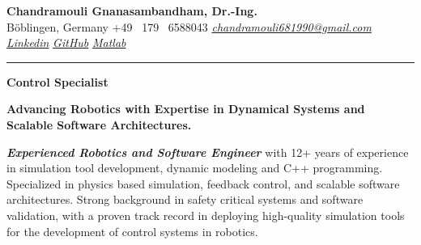 \documentclass[a4paper,10pt]{article}
\newcommand{\link}[1]{{\textit{#1}}}
\begin{document}
\thispagestyle{plain}

\begin{center}
    {\Large \textbf{Chandramouli Gnanasambandham, Dr.-Ing.}}\\ 
    
    \vspace{0.2cm}
    \small B\"oblingen, Germany \hfill  \bullet  \hfill  +49 \ 179 \ 6588043 \hfill \bullet  \hfill
    \textup{\href{mailto:chandramouli681990@gmail.com}{\link{chandramouli681990@gmail.com}}} \hfill \bullet \hfill
    \textup{\href{https://linkedin.com/in/ganasambandhamc}{\link{Linkedin}}} \hfill \bullet \hfill
    \textup{\href{https://github.com/chandramouli6890}{\link{GitHub}}} \hfill \bullet \hfill
    \textup{\href{https://de.mathworks.com/matlabcentral/profile/authors/4267772}{\link{Matlab}}}

    \vspace{-0.2cm}
    {\rule{\linewidth}{0.8pt}}

    \vspace{0.2cm}
    {\Large \textbf{Control Specialist}}
    
    \vspace{0.1cm}
    \colorbox{gray!40}{%
        \parbox{0.99\textwidth}{%
            \centering \textcolor{highlightcolor}{\textbf{Advancing Robotics with Expertise in Dynamical Systems and Scalable Software Architectures.}}
        }%
    }
\end{center}


\noindent \textcolor{highlightcolor}{\textit{\textbf{Experienced Robotics and
Software Engineer}}} with 12+ years of experience in simulation tool
development, dynamic modeling and C++ programming. Specialized in physics based
simulation, feedback control, and scalable software architectures. Strong
background in safety critical systems and software validation, with a proven
track record in deploying high-quality simulation tools for the development of
control systems in robotics.
\end{document}
